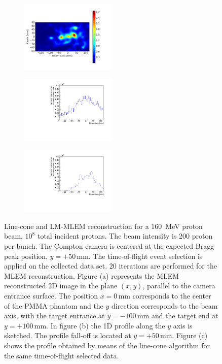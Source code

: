 \begin{figure}
\centering
 \begin{subfigure}[t]{.49\textwidth}
 \includegraphics[width=0.5\textwidth,clip=true,trim=0 70 130 90]{03_GraphicFiles/chapter4_HTsimu/projection2D_Z_corr_r20.png}
 \caption{}
 \label{}
\end{subfigure}
 \begin{subfigure}[t]{.49\textwidth}
\includegraphics[width=0.5\textwidth]{03_GraphicFiles/chapter4_HTsimu/new/recon_profile_line-cone_lowStat_norm.pdf}
 \caption{}
 \label{}
\end{subfigure}
 \begin{subfigure}[t]{.49\textwidth}
\includegraphics[width=0.5\textwidth]{03_GraphicFiles/chapter4_HTsimu/new/reconstructed_lowStat_profile_norm.pdf}
 \caption{}
 \label{}
\end{subfigure}
\caption{Line-cone and LM-MLEM reconstruction for a 160~MeV proton beam, $10^{8}$ total incident protons. The beam intensity is 200 proton per bunch. The Compton camera is centered at the expected Bragg peak position, $y=+50\,$mm. The time-of-flight event selection is applied on the collected data set. 20 iterations are performed for the MLEM reconstruction.
Figure (a) represents the MLEM reconstructed 2D image in the plane $(x,y)$, parallel to the camera entrance surface. The position $x=0\,$mm corresponds to the center of the PMMA phantom and the $y$ direction corresponds to the beam axis, with the target entrance at $y=-100\,$mm and the target end at $y=+100\,$mm.  In figure (b) the 1D profile along the $y$ axis is sketched. The profile fall-off is located at $y=+50\,$mm. Figure (c) shows the profile obtained by means of the line-cone algorithm for the same time-of-flight selected data.}
\label{chap4::fig::comparison}
\end{figure}


